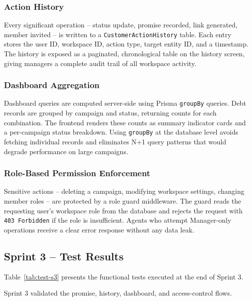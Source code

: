 ﻿\documentclass[12pt,a4paper]{report}
\begin{document}
\subsubsection{Action History}

Every significant operation -- status update, promise recorded, link generated,
member invited -- is written to a \texttt{CustomerActionHistory} table.
Each entry stores the user ID, workspace ID, action type, target entity ID, and a
timestamp.
The history is exposed as a paginated, chronological table on the history screen,
giving managers a complete audit trail of all workspace activity.

\subsubsection{Dashboard Aggregation}

Dashboard queries are computed server-side using Prisma \texttt{groupBy} queries.
Debt records are grouped by campaign and status, returning counts for each combination.
The frontend renders these counts as summary indicator cards and a per-campaign
status breakdown.
Using \texttt{groupBy} at the database level avoids fetching individual records and
eliminates N+1 query patterns that would degrade performance on large campaigns.

\subsubsection{Role-Based Permission Enforcement}

Sensitive actions -- deleting a campaign, modifying workspace settings, changing
member roles -- are protected by a role guard middleware.
The guard reads the requesting user's workspace role from the database and rejects
the request with \texttt{403 Forbidden} if the role is insufficient.
Agents who attempt Manager-only operations receive a clear error response without
any data leak.

\subsection{Sprint 3 -- Test Results}

Table~\ref{tab:test-s3} presents the functional tests executed at the end of Sprint 3.

\noindent Sprint 3 validated the promise, history, dashboard, and access-control flows.
\end{document}
